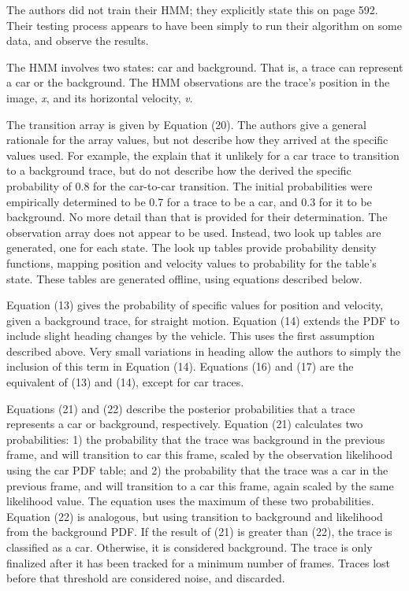 \documentclass[11pt]{article}
\begin{document}
\begin{description}[leftmargin=0in]
        The authors did not train their HMM; they explicitly state this on page 592. Their testing
        process appears to have been simply to run their algorithm on some data, and observe the
        results.

        The HMM involves two states: car and background. That is, a trace can represent a car or the
        background. The HMM observations are the trace's position in the image, \emph{x}, and its
        horizontal velocity, \emph{v}.

        The transition array is given by Equation (20). The authors give a general rationale for the
        array values, but not describe how they arrived at the specific values used. For example,
        the explain that it unlikely for a car trace to transition to a background trace, but do not
        describe how the derived the specific probability of 0.8 for the car-to-car transition. The
        initial probabilities were empirically determined to be 0.7 for a trace to be a car, and 0.3
        for it to be background. No more detail than that is provided for their determination. The
        observation array does not appear to be used. Instead, two look up tables are generated, one
        for each state. The look up tables provide probability density functions, mapping position
        and velocity values to probability for the table's state. These tables are generated
        offline, using equations described below.

        Equation (13) gives the probability of specific values for position and velocity, given a
        background trace, for straight motion. Equation (14) extends the PDF to include slight
        heading changes by the vehicle. This uses the first assumption described above. Very small
        variations in heading allow the authors to simply the inclusion of this term in Equation
        (14). Equations (16) and (17) are the equivalent of (13) and (14), except for car traces. 

        Equations (21) and (22) describe the posterior probabilities that a trace represents a car
        or background, respectively. Equation (21) calculates two probabilities: 1) the probability
        that the trace was background in the previous frame, and will transition to car this frame,
        scaled by the observation likelihood using the car PDF table; and 2) the probability that
        the trace was a car in the previous frame, and will transition to a car this frame, again
        scaled by the same likelihood value. The equation uses the maximum of these two
        probabilities. Equation (22) is analogous, but using transition to background and likelihood
        from the background PDF. If the result of (21) is greater than (22), the trace is classified
        as a car. Otherwise, it is considered background. The trace is only finalized after it has
        been tracked for a minimum number of frames. Traces lost before that threshold are
        considered noise, and discarded.


\end{description}
\end{document}

